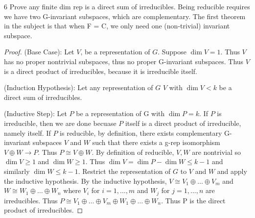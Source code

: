 \documentclass{article}
\begin{document}
\bigskip

\begin{PROB}{6}\label{Problem 6.}
    Prove any finite dim rep is a direct sum of irreducibles. Being reducible requires we have two G-invariant subspaces, which are complementary. The first theorem in the subject is that when F = C, we only need one (non-trivial) invariant subspace.
\end{PROB} 
\begin{proof}
    (Base Case): Let $V$, be a representation of $G$. Suppose $\dim V = 1$. Thus $V$  has no proper nontrivial subspaces, thus no proper G-invariant subspaces. Thus $V$ is a direct product of irreducibles, because it is irreducible itself. 
    
    (Induction Hypothesis): Let any representation of $G$ $V$ with $\dim V < k$ be a direct sum of irreducibles.
    
    (Inductive Step): Let $P$ be a representation of G with $\dim P = k$. If $P$ is irreducible, then we are done becuase $P$ itself is a direct product of irreducible, namely itself. If $P$ is reducible, by definition, there exists complementary G-invariant subspaces $V$ and $W$ such that there exists a g-rep isomorphism $V \oplus W \to P$. Thus $P \cong V \oplus W$. By definition of reducible, $V, W$ are nontrivial so $\dim V \geq 1$ and $\dim W \geq 1$. Thus $\dim V = \dim P - \dim W \leq k - 1$ and similarly $\dim W \leq k - 1$. Restrict the representation of $G$ to $V$ and $W$ and apply the inductive hypothesis. By the inductive hypothesis, $V \cong V_1 \oplus \dots \oplus V_m$ and $W \cong W_1 \oplus \dots \oplus W_n$ where $V_i$ for $i = 1, \dots, m$  and $W_j$ for $j = 1, \dots, n$ are irreducibles. Thus $P \cong V_1 \oplus \dots \oplus V_m \oplus W_1 \oplus \dots \oplus W_n$. Thus P is the direct product of irreducibles.                   
\end{proof}

\bigskip
\end{document}

